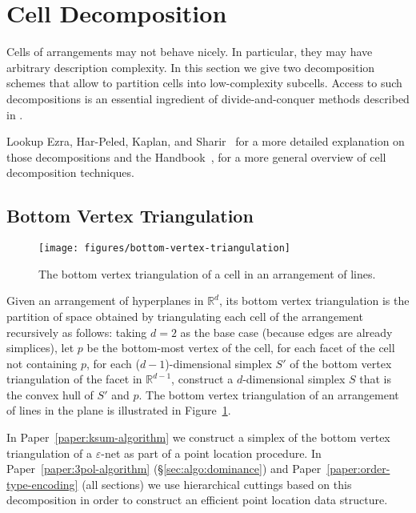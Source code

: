 \section{Cell Decomposition}%
\label{sec:arrangements:cell-decomposition}

Cells of arrangements may not behave nicely. In particular, they may have
arbitrary description complexity.
%
In this section we give two decomposition schemes that allow to partition cells
into low-complexity subcells.
%
Access to such decompositions is an essential ingredient of divide-and-conquer
methods described in .

Lookup Ezra, Har-Peled, Kaplan, and Sharir~\cite{EHKS17} for a more detailed
explanation on those decompositions
%
and
%
the Handbook~\cite[\S24.3.2]{Hal04},
for a more general overview of cell decomposition techniques.

\subsection{Bottom Vertex Triangulation}%
\label{sec:arrangements:triangulation}

\begin{figure}
  \centering{}
  \texttt{[image: figures/bottom-vertex-triangulation]}
  \caption{%
    The bottom vertex triangulation of a cell in an arrangement of lines.%
  }%
  \label{fig:bvt}
\end{figure}

Given an arrangement of hyperplanes in \(\mathbb{R}^d\), its bottom vertex
triangulation is the partition of space obtained by triangulating each cell of
the arrangement recursively as follows: taking \(d=2\) as the base case
(because edges are already simplices),
let \(p\) be the bottom-most vertex of the cell,
for each facet of the cell not containing \(p\),
for each (\(d-1\))-dimensional simplex \(S'\) of the bottom vertex triangulation
of the facet in \(\mathbb{R}^{d-1}\),
construct a \(d\)-dimensional simplex \(S\) that is the convex hull of
\(S'\) and \(p\).
%
The
bottom vertex triangulation of an arrangement of lines in the plane is illustrated
in Figure~\ref{fig:bvt}.

In Paper~\ref{paper:ksum-algorithm} we construct a simplex of the bottom vertex
triangulation of a \(\varepsilon\)-net as part of a point location procedure.
%
In Paper~\ref{paper:3pol-algorithm} (\S\ref{sec:algo:dominance})
and Paper~\ref{paper:order-type-encoding} (all sections)
we use hierarchical cuttings based on this decomposition in order to construct
an efficient point location data structure.

